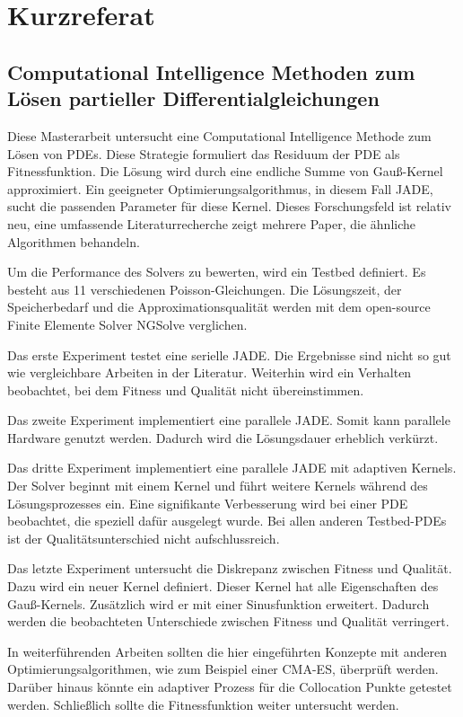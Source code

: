 \documentclass[./\jobname.tex]{subfiles}
\begin{document}
\setcounter{page}{2}
\chapter*{Kurzreferat}
\section*{Computational Intelligence Methoden zum Lösen partieller Differentialgleichungen}
%
Diese Masterarbeit untersucht eine Computational Intelligence Methode zum Lösen von PDEs. Diese Strategie formuliert das Residuum der PDE als Fitnessfunktion. Die Lösung wird durch eine endliche Summe von Gauß-Kernel approximiert. Ein geeigneter Optimierungsalgorithmus, in diesem Fall JADE, sucht die passenden Parameter für diese Kernel. Dieses Forschungsfeld ist relativ neu, eine umfassende Literaturrecherche zeigt mehrere Paper, die ähnliche Algorithmen behandeln.

Um die Performance des Solvers zu bewerten, wird ein Testbed definiert. Es besteht aus 11 verschiedenen Poisson-Gleichungen. Die Lösungszeit, der Speicherbedarf und die Approximationsqualität werden mit dem open-source Finite Elemente Solver NGSolve verglichen. 

Das erste Experiment testet eine serielle JADE. Die Ergebnisse sind nicht so gut wie vergleichbare Arbeiten in der Literatur. Weiterhin wird ein Verhalten beobachtet, bei dem Fitness und Qualität nicht übereinstimmen.
 
Das zweite Experiment implementiert eine parallele JADE. Somit kann parallele Hardware genutzt werden. Dadurch wird die Lösungsdauer erheblich verkürzt. 

Das dritte Experiment implementiert eine parallele JADE mit adaptiven Kernels. Der Solver beginnt mit einem Kernel und führt weitere Kernels während des Lösungsprozesses ein. Eine signifikante Verbesserung wird bei einer PDE beobachtet, die speziell dafür ausgelegt wurde. Bei allen anderen Testbed-PDEs ist der Qualitätsunterschied nicht aufschlussreich.

Das letzte Experiment untersucht die Diskrepanz zwischen Fitness und Qualität. Dazu wird ein neuer Kernel definiert. Dieser Kernel hat alle Eigenschaften des Gauß-Kernels. Zusätzlich wird er mit einer Sinusfunktion erweitert. Dadurch werden die beobachteten Unterschiede zwischen Fitness und Qualität verringert. 

In weiterführenden Arbeiten sollten die hier eingeführten Konzepte mit anderen Optimierungsalgorithmen, wie zum Beispiel einer CMA-ES, überprüft werden. Darüber hinaus könnte ein adaptiver Prozess für die Collocation Punkte getestet werden. Schließlich sollte die Fitnessfunktion weiter untersucht werden.
%
\end{document}
